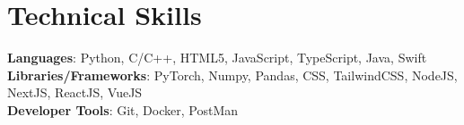 \documentclass[letterpaper,11pt]{article}
\begin{document}
\section{Technical Skills}
 \begin{itemize}[leftmargin=0.15in, label={}]
    \small{\item{   
     \textbf{Languages}{: Python, C/C++, HTML5, JavaScript, TypeScript, Java, Swift} \\[1mm]
     \textbf{Libraries/Frameworks}{: PyTorch, Numpy, Pandas, CSS, TailwindCSS, NodeJS, NextJS, ReactJS, VueJS} \\ [1mm]
     \textbf{Developer Tools}{: Git, Docker, PostMan} \\[1mm]

    }}
 \end{itemize}
 \vspace{-16pt}
 \vspace{3pt}
\vspace{10pt}

\vspace{-15pt}
\end{document}
